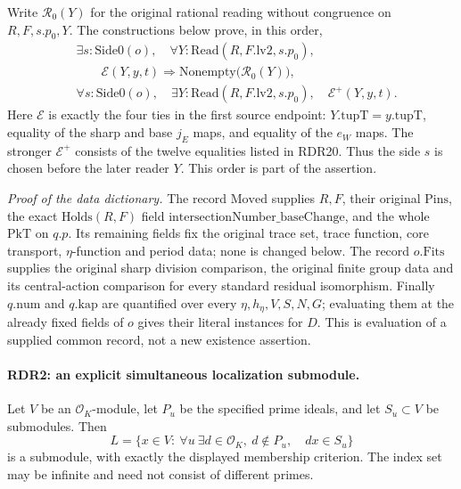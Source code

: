 Write \(\mathcal R_0(Y)\) for the original rational reading
without congruence on \(R,F,s.p_0,Y\).  The constructions
below prove, in this order,
\[
\begin{split}
 &\exists s:\mathrm{Side0}(o),\quad
   \forall Y:\mathrm{Read}(R,F.\mathrm{lv2},s.p_0),\\
 &\hspace{2em}\mathcal E(Y,y,t)\Longrightarrow
                       \mathrm{Nonempty}\bigl(\mathcal R_0(Y)\bigr),\\
 &\forall s:\mathrm{Side0}(o),\quad
   \exists Y:\mathrm{Read}(R,F.\mathrm{lv2},s.p_0),\quad
                  \mathcal E^{+}(Y,y,t).
\end{split}                                                   \tag{RDR.2}
\]
Here \(\mathcal E\) is exactly the four ties in the first source
endpoint: \(Y.\mathrm{tupT}=y.\mathrm{tupT}\), equality of the sharp
and base \(j_E\) maps, and equality of the \(e_W\) maps.
The stronger \(\mathcal E^{+}\) consists of the twelve equalities
listed in RDR20.  Thus the side \(s\) is chosen before the later
reader \(Y\).  This order is part of the assertion.

\emph{Proof of the data dictionary.}
The record \(\mathrm{Moved}\) supplies \(R,F\), their original
\(\mathrm{Pins}\), the exact \(\mathrm{Holds}(R,F)\) field
\(\mathrm{intersectionNumber\_baseChange}\), and the whole \(\mathrm{PkT}\)
on \(q.p\).  Its remaining fields fix the original trace set, trace
function, core transport, \(\eta\)-function and period data; none is
changed below.  The record \(o.\mathrm{Fits}\) supplies the original
sharp division comparison, the original finite group data and its
central-action comparison for every standard residual isomorphism.
Finally \(q.\mathrm{num}\) and \(q.\mathrm{kap}\) are quantified over
every \(\eta,h_\eta,V,S,N,G\); evaluating them at the already fixed
fields of \(o\) gives their literal instances for \(D\).  This is
evaluation of a supplied common record, not a new existence assertion.

\paragraph{RDR2: an explicit simultaneous localization submodule.}
\label{claim:RDR2}
Let \(V\) be an \(\mathcal O_K\)-module, let \(P_u\) be the
specified prime ideals, and let \(S_u\subset V\) be submodules.
Then
\[
 L=\{x\in V:\ \forall u\ \exists d\in\mathcal O_K,
                     \ d\notin P_u,\quad dx\in S_u\}        \tag{RDR.3}
\]
is a submodule, with exactly the displayed membership criterion.
The index set may be infinite and need not consist of different primes.


